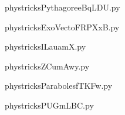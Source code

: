     \newcommand{\CaptionFigPythagoreeBqLDU}{<+Type your caption here+>}
    \begin{center}
        
    \end{center}
    phystricksPythagoreeBqLDU.py

    

    \clearpage
    


    \newcommand{\CaptionFigExoVectoFRPXxB}{<+Type your caption here+>}
    \begin{center}
        
    \end{center}
    phystricksExoVectoFRPXxB.py

    

    \clearpage
    


    \newcommand{\CaptionFigILauamX}{<+Type your caption here+>}
    \begin{center}
        
    \end{center}
    phystricksILauamX.py

    

    \clearpage
    


    \newcommand{\CaptionFigZCumAwy}{<+Type your caption here+>}
    \begin{center}
        
    \end{center}
    phystricksZCumAwy.py

    

    \clearpage
    


    \newcommand{\CaptionFigParabolesfTKFw}{<+Type your caption here+>}
    \begin{center}
        
    \end{center}
    phystricksParabolesfTKFw.py

    

    \clearpage
    


    \newcommand{\CaptionFigPUGmLBC}{<+Type your caption here+>}
    \begin{center}
        
    \end{center}
    phystricksPUGmLBC.py

